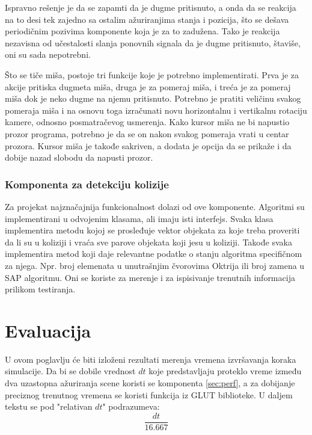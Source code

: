 \documentclass[12pt,oneside]{memoir}
\begin{document}
Ispravno rešenje je da se zapamti da je dugme pritisnuto, a onda da se reakcija na to desi tek zajedno sa ostalim ažuriranjima 
stanja i pozicija, što se dešava periodičnim pozivima komponente koja je za to zadužena. Tako je reakcija nezavisna od učestalosti 
slanja ponovnih signala da je dugme pritisnuto, štaviše, oni su sada nepotrebni. 

Što se tiče miša, postoje tri funkcije koje je potrebno implementirati. Prva je za akcije pritiska 
dugmeta miša, druga je za pomeraj miša, i treća je za pomeraj miša dok je neko dugme na njemu pritisnuto.
Potrebno je pratiti veličinu svakog pomeraja miša i na osnovu toga izračunati novu horizontalnu i vertikalnu rotaciju 
kamere, odnosno posmatračevog usmerenja. Kako kursor miša ne bi napustio prozor programa, potrebno je da se on nakon svakog pomeraja 
vrati u centar prozora. Kursor miša je takođe sakriven, a dodata je opcija da se prikaže i da dobije nazad slobodu da napusti prozor.

\subsection{Komponenta za detekciju kolizije}

Za projekat najznačajnija funkcionalnost dolazi od ove komponente. 
Algoritmi su implementirani u odvojenim klasama, ali imaju isti interfejs.
Svaka klasa implementira metodu kojoj se prosleđuje vektor objekata za koje treba proveriti da li su u koliziji
i vraća sve parove objekata koji jesu u koliziji. Takođe svaka implementira metod koji daje relevantne podatke 
o stanju algoritma specifičnom za njega. Npr. broj elemenata u unutrašnjim čvorovima Oktrija ili broj 
zamena u SAP algoritmu. Oni se koriste za merenje i za ispisivanje trenutnih informacija prilikom testiranja.

\chapter{Evaluacija}
\label{sec:evaluacija}

U ovom poglavlju će biti izloženi rezultati merenja vremena izvršavanja koraka simulacije.
Da bi se dobile vrednost $dt$ koje predstavljaju proteklo vreme između dva uzastopna ažuriranja scene
koristi se komponenta \ref{sec:perf}, a za dobijanje preciznog trenutnog vremena se koristi funkcija iz GLUT biblioteke.
U daljem tekstu se pod "relativan $dt$" podrazumeva:
$$ \frac{ dt }{16.667} $$
\end{document}

